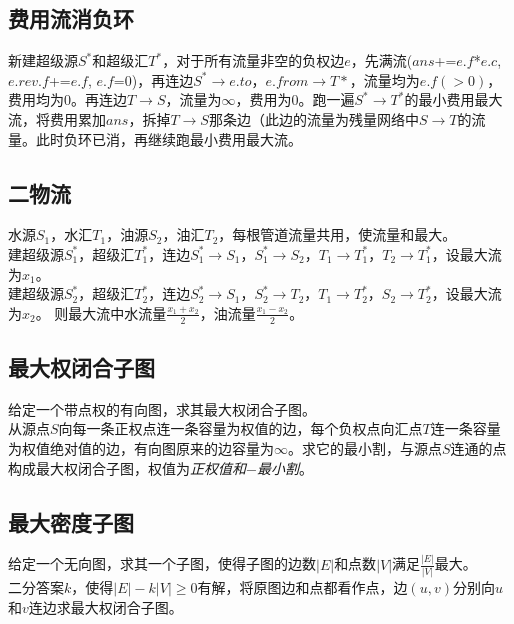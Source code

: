 	\subsection*{费用流消负环}
		新建超级源$ S^\ast $和超级汇$ T^\ast $，对于所有流量非空的负权边$ e $，先满流($ ans $+=$ e.f $*$ e.c $, $  e.rev.f $+=$ e.f $, $ e.f $=$ 0 $)，再连边$ S^\ast \to e.to $，$ e.from \to T\ast $，流量均为$ e.f (> 0) $，费用均为$ 0 $。再连边$ T \to S $，流量为$ \infty $，费用为$ 0 $。跑一遍$ S^\ast \to T^\ast $的最小费用最大流，将费用累加$ ans $，拆掉$ T \to S $那条边（此边的流量为残量网络中$ S \to T $的流量。此时负环已消，再继续跑最小费用最大流。
	\subsection*{二物流}
		水源$ S_1 $，水汇$ T_1 $，油源$ S_2 $，油汇$ T_2 $，每根管道流量共用，使流量和最大。
		\\建超级源$ S_1^\ast $，超级汇$ T_1^\ast $，连边$ S_1^\ast \to S_1 $，$ S_1^\ast \to S_2 $，$ T_1 \to T_1^\ast $，$ T_2 \to T_1^\ast $，设最大流为$ x_1 $。
		\\建超级源$ S_2^\ast $，超级汇$ T_2^\ast $，连边$ S_2^\ast \to S_1 $，$ S_2^\ast \to T_2 $，$ T_1 \to T_2^\ast $，$ S_2 \to T_2^\ast $，设最大流为$ x_2 $。
		则最大流中水流量$ \frac{x_1 + x_2}{2} $，油流量$ \frac{x_1 - x_2}{2} $。
	\subsection*{最大权闭合子图}
		给定一个带点权的有向图，求其最大权闭合子图。
		\\从源点$ S $向每一条正权点连一条容量为权值的边，每个负权点向汇点$ T $连一条容量为权值绝对值的边，有向图原来的边容量为$ \infty $。求它的最小割，与源点$ S $连通的点构成最大权闭合子图，权值为\textit{正权值和}$ - $\textit{最小割}。
	\subsection*{最大密度子图}
		给定一个无向图，求其一个子图，使得子图的边数$ \left| E \right| $和点数$ \left| V \right| $满足$ \frac{\left| E \right|}{\left| V \right|} $最大。
		\\二分答案$ k $，使得$ \left| E \right| - k \left| V \right| \geq 0 $有解，将原图边和点都看作点，边$ (u, v) $分别向$ u $和$ v $连边求最大权闭合子图。
		